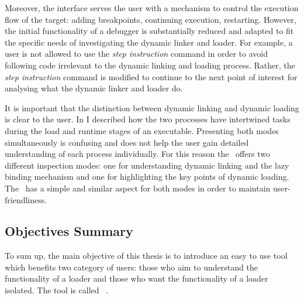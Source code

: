 Moreover, the interface serves the user with a mechanism to control the execution flow of the target: adding breakpoints, continuing execution, restarting. However, the initial functionality of  a debugger is substantially reduced and adapted to fit the specific needs of investigating the dynamic linker and loader. For example, a user is not allowed to use the \textit{step instruction} command in order to avoid following code irrelevant to the dynamic linking and loading process. Rather, the \textit{step instruction} command is modified to continue to the next point of interest for analysing what the dynamic linker and loader do.

It is important that the distinction between dynamic linking and dynamic loading is clear to the user. In  I described how the two processes have intertwined tasks during the load and runtime stages of an executable. Presenting both modes simultaneously is confusing and does not help the user gain detailed understanding of each process individually. For this reason the \gui\ offers two different inspection modes: one for understanding dynamic linking and the lazy binding mechanism and one for highlighting the key points of dynamic loading. The \gui\ has a simple and similar aspect for both modes in order to maintain user-friendliness.

\subsection{Objectives Summary}
\label{sub-sec:objective-summ}

To sum up, the main objective of this thesis is to introduce an easy to use tool which benefits two category of users: those who aim to understand the functionality of a loader and those who want the functionality of a loader isolated. The tool is called \project\ .
